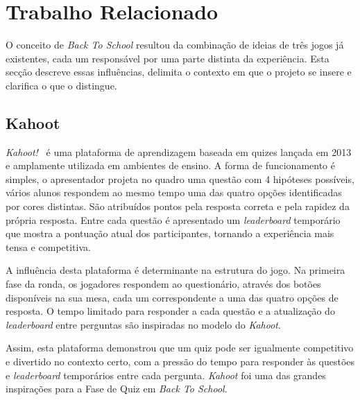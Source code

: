 \chapter{Trabalho Relacionado}
\label{ch:trabalhoRelacionado}

O conceito de \textit{Back To School} resultou da combinação de ideias de três jogos já existentes, cada um responsável por uma parte distinta da experiência. Esta secção descreve essas influências, delimita o contexto em que o projeto se insere e clarifica o que o distingue.


\section{Kahoot}
\label{sec:kahoot}

\textit{Kahoot!}~\cite{Kahoot2013} é uma plataforma de aprendizagem baseada em quizes lançada em 2013 e amplamente utilizada em ambientes de ensino. A forma de funcionamento é simples, o apresentador projeta no quadro uma questão com 4 hipóteses possíveis, vários alunos respondem ao mesmo tempo uma das quatro opções identificadas por cores distintas. São atribuídos pontos pela resposta correta e pela rapidez da própria resposta. Entre cada questão é apresentado um \textit{leaderboard} temporário que mostra a pontuação atual dos participantes, tornando a experiência mais tensa e competitiva.

A influência desta plataforma é determinante na estrutura do jogo. Na primeira fase da ronda, os jogadores respondem ao questionário, através dos botões disponíveis na sua mesa, cada um correspondente a uma das quatro opções de resposta. O tempo limitado para responder a cada questão e a atualização do \textit{leaderboard} entre perguntas são inspiradas no modelo do \textit{Kahoot}.

Assim, esta plataforma demonstrou que um quiz pode ser igualmente competitivo e divertido no contexto certo, com a pressão do tempo para responder às questões e \textit{leaderboard} temporários entre cada pergunta. \textit{Kahoot} foi uma das grandes inspirações para a Fase de Quiz em \textit{Back To School}.



